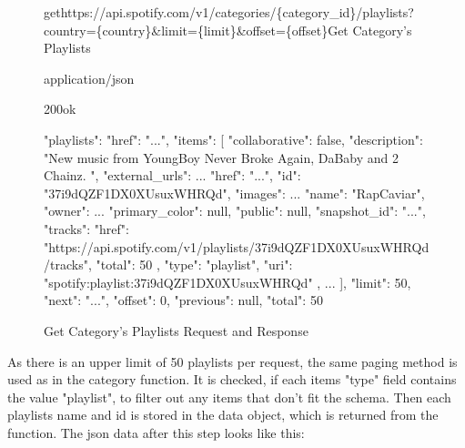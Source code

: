 \begin{figure}[H]
    \caption{Get Category's Playlists Request and Response}
	\label{fig:Get Category's Playlists Request and Response}
\begin{apiRoute}{get}{https://api.spotify.com/v1/categories/\{category\_id\}/playlists?country=\{country\}\&limit=\{limit\}\&offset=\{offset\}}{Get Category's Playlists}
    \begin{routeParameter}
    \end{routeParameter}
    \begin{routeResponse}{application/json}
        \begin{routeResponseItem}{200}{ok}
            \begin{routeResponseItemBody}
{
    "playlists": {
        "href": "...",
        "items": [
            {
                "collaborative": false,
                "description": "New music from YoungBoy Never Broke Again, DaBaby and 2 Chainz. ",
                "external_urls": ...
                "href": "...",
                "id": "37i9dQZF1DX0XUsuxWHRQd",
                "images": ...
                "name": "RapCaviar",
                "owner": ...
                "primary_color": null,
                "public": null,
                "snapshot_id": "...",
                "tracks": {
                    "href": "https://api.spotify.com/v1/playlists/37i9dQZF1DX0XUsuxWHRQd/tracks",
                    "total": 50
                },
                "type": "playlist",
                "uri": "spotify:playlist:37i9dQZF1DX0XUsuxWHRQd"
            },
            ...
        ],
        "limit": 50,
        "next": "...",
        "offset": 0,
        "previous": null,
        "total": 50
    }
}
            \end{routeResponseItemBody}
        \end{routeResponseItem}
    \end{routeResponse}
\end{apiRoute}
\end{figure}

As there is an upper limit of 50 playlists per request, the same paging method is used as in the category function.
It is checked, if each items "type" field contains the value "playlist", to filter out any items that don't fit the schema.
Then each playlists name and id is stored in the data object, which is returned from the function.
The json data after this step looks like this:

